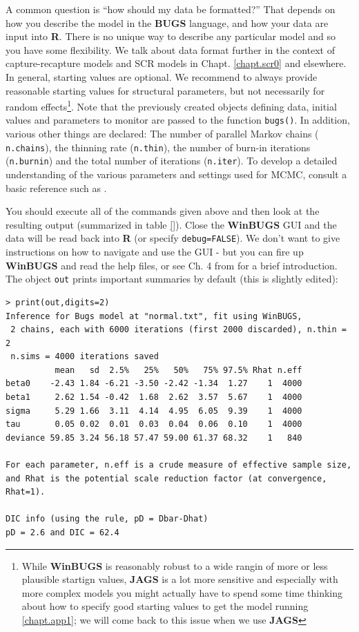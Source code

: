 A common question is ``how should my data be
formatted?'' That depends on how you describe the model in the {\bf
  BUGS} language, and how your data are input into {\bf R}.
 There is no unique way to describe any
particular model and so you have some flexibility. We talk about data
format further in the context of capture-recapture models and SCR
models in Chapt. \ref{chapt.scr0} and elsewhere.  In general,
starting values are optional. We recommend to always provide
reasonable starting values for structural parameters, but not
necessarily for random effects\footnote{While {\bf WinBUGS} is reasonably robust to a wide rangin of more or less plausible startign values, {\bf JAGS} is a lot more sensitive and especially with more complex models you might actually have to spend some time thinking about how to specify good starting values to get the model running \ref{chapt.app1}; we will come back to this issue when we use {\bf JAGS}}.  Note that the previously created
objects defining data, initial values and parameters to monitor are
passed to the function \mbox{\tt bugs()}.  In addition, various other
things are declared: The number of parallel Markov chains (\mbox{\tt
  n.chains}), the thinning rate (\mbox{\tt n.thin}),
the number of burn-in iterations (\mbox{\tt n.burnin}) and the total
number of iterations
(\mbox{\tt n.iter}).
To develop a detailed understanding of the various parameters and
settings used for MCMC, consult a basic reference such as
\citet{kery:2010}.



You should execute all of the commands given above and then look at
the resulting output (summarized in table \ref{}). Close the {\bf WinBUGS} GUI and the data will be
read back into {\bf R} (or specify \mbox{\tt debug=FALSE}).  We don't
want to give instructions on how to navigate and use the GUI - but you
can fire up {\bf WinBUGS} and read the help files, or see Ch. 4 from
\citet{kery:2010} for a brief introduction.
The object \mbox{\tt out} prints important
summaries by default (this is slightly edited):

{\small
\begin{verbatim}
> print(out,digits=2)
Inference for Bugs model at "normal.txt", fit using WinBUGS,
 2 chains, each with 6000 iterations (first 2000 discarded), n.thin = 2
 n.sims = 4000 iterations saved
          mean   sd  2.5%   25%   50%   75% 97.5% Rhat n.eff
beta0    -2.43 1.84 -6.21 -3.50 -2.42 -1.34  1.27    1  4000
beta1     2.62 1.54 -0.42  1.68  2.62  3.57  5.67    1  4000
sigma     5.29 1.66  3.11  4.14  4.95  6.05  9.39    1  4000
tau       0.05 0.02  0.01  0.03  0.04  0.06  0.10    1  4000
deviance 59.85 3.24 56.18 57.47 59.00 61.37 68.32    1   840

For each parameter, n.eff is a crude measure of effective sample size,
and Rhat is the potential scale reduction factor (at convergence, Rhat=1).

DIC info (using the rule, pD = Dbar-Dhat)
pD = 2.6 and DIC = 62.4
\end{verbatim}
}

